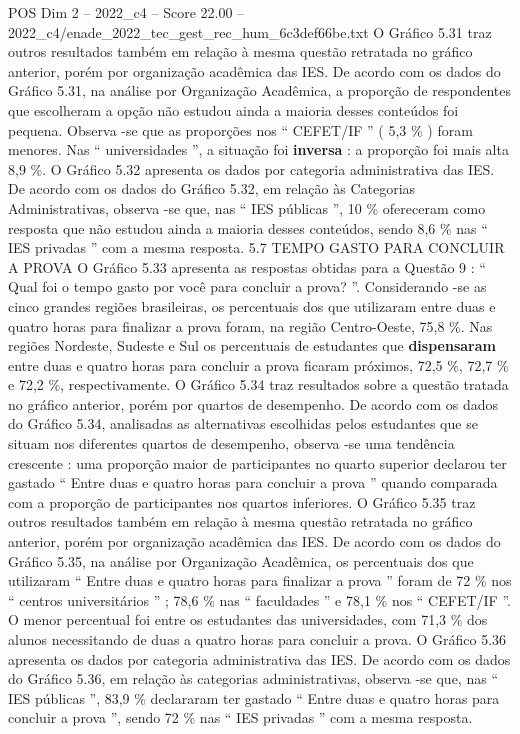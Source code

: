 \begin{textsample}{POS Dim 2 – 2022\_c4 – Score 22.00 – 2022\_c4/enade\_2022\_tec\_gest\_rec\_hum\_6c3def66be.txt}
O Gráfico 5.31 traz outros resultados também em relação à mesma questão retratada no gráfico anterior, porém por organização acadêmica das IES.
De acordo com os dados do Gráfico 5.31, na análise por Organização Acadêmica, a proporção de respondentes que escolheram a opção não estudou ainda a maioria desses conteúdos foi pequena.
Observa -se que as proporções nos “ CEFET/IF ” ( 5,3 \% ) foram menores.
Nas “ universidades ”, a situação foi \textbf{inversa} : a proporção foi mais alta 8,9 \%.
O Gráfico 5.32 apresenta os dados por categoria administrativa das IES.
De acordo com os dados do Gráfico 5.32, em relação às Categorias Administrativas, observa -se que, nas “ IES públicas ”, 10 \% ofereceram como resposta que não estudou ainda a maioria desses conteúdos, sendo 8,6 \% nas “ IES privadas ” com a mesma resposta. 5.7 TEMPO GASTO PARA CONCLUIR A PROVA O Gráfico 5.33 apresenta as respostas obtidas para a Questão 9 : “ Qual foi o tempo gasto por você para concluir a prova? ”.
Considerando -se as cinco grandes regiões brasileiras, os percentuais dos que utilizaram entre duas e quatro horas para finalizar a prova foram, na região Centro-Oeste, 75,8 \%.
Nas regiões Nordeste, Sudeste e Sul os percentuais de estudantes que \textbf{dispensaram} entre duas e quatro horas para concluir a prova ficaram próximos, 72,5 \%, 72,7 \% e 72,2 \%, respectivamente.
O Gráfico 5.34 traz resultados sobre a questão tratada no gráfico anterior, porém por quartos de desempenho.
De acordo com os dados do Gráfico 5.34, analisadas as alternativas escolhidas pelos estudantes que se situam nos diferentes quartos de desempenho, observa -se uma tendência crescente : uma proporção maior de participantes no quarto superior declarou ter gastado “ Entre duas e quatro horas para concluir a prova ” quando comparada com a proporção de participantes nos quartos inferiores.
O Gráfico 5.35 traz outros resultados também em relação à mesma questão retratada no gráfico anterior, porém por organização acadêmica das IES.
De acordo com os dados do Gráfico 5.35, na análise por Organização Acadêmica, os percentuais dos que utilizaram “ Entre duas e quatro horas para finalizar a prova ” foram de 72 \% nos “ centros universitários ” ; 78,6 \% nas “ faculdades ” e 78,1 \% nos “ CEFET/IF ”.
O menor percentual foi entre os estudantes das universidades, com 71,3 \% dos alunos necessitando de duas a quatro horas para concluir a prova.
O Gráfico 5.36 apresenta os dados por categoria administrativa das IES.
De acordo com os dados do Gráfico 5.36, em relação às categorias administrativas, observa -se que, nas “ IES públicas ”, 83,9 \% declararam ter gastado “ Entre duas e quatro horas para concluir a prova ”, sendo 72 \% nas “ IES privadas ” com a mesma resposta.

\end{textsample}
